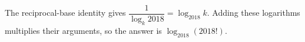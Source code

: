 The reciprocal-base identity gives $\dfrac{1}{\log_k2018}=\log_{2018}k$. Adding these logarithms multiplies their arguments, so the answer is $\boxed{\log_{2018}(2018!)}$.
